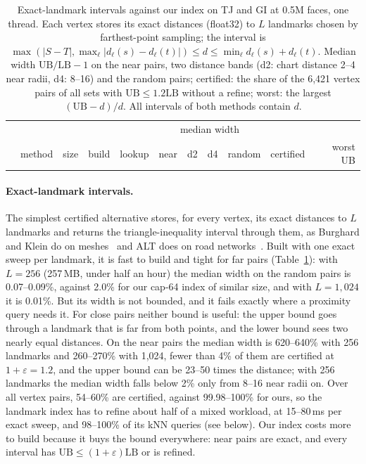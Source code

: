 \documentclass[sigconf,nonacm,screen]{acmart}
\newcommand{\LB}{\mathrm{LB}}
\newcommand{\UB}{\mathrm{UB}}
\newcommand{\eps}{\varepsilon}
\begin{document}
\begin{table}[t]
\caption{Exact-landmark intervals against our index on TJ and GI at 0.5M faces, one thread. Each vertex stores its
exact distances (float32) to $L$ landmarks chosen by farthest-point sampling; the interval is
$\max(|S-T|,\max_\ell|d_\ell(s)-d_\ell(t)|)\le d\le\min_\ell d_\ell(s)+d_\ell(t)$. Median width $\UB/\LB-1$ on the near
pairs, two distance bands (d2: chart distance 2--4 near radii, d4: 8--16) and the random pairs; certified: the share
of the 6,421 vertex pairs of all sets with $\UB\le1.2\LB$ without a refine; worst: the largest $(\UB-d)/d$. All
intervals of both methods contain $d$.}
\label{tab:landmarks}
\small
\begin{tabular}{@{}llrrr|rrrr|rr@{}}
\toprule
 & & & & & \multicolumn{4}{c|}{median width} & & \\
 & method & size & build & lookup & near & d2 & d4 & random & certified & worst UB\\
\midrule

\end{tabular}
\end{table}

\paragraph{Exact-landmark intervals.}
The simplest certified alternative stores, for every vertex, its exact distances to $L$ landmarks and returns the
triangle-inequality interval through them, as Burghard and Klein do on meshes~\cite{burghard2015simple} and ALT
does on road networks~\cite{goldberg2005computing}. Built with one exact sweep per landmark, it is fast to build
and tight for far pairs (Table~\ref{tab:landmarks}): with $L=256$ (257\,MB, under half an hour) the median width on
the random pairs is 0.07--0.09\%, against 2.0\% for our cap-64 index of similar size, and with $L=1{,}024$ it is
0.01\%. But its width is not bounded, and it fails exactly where a proximity query needs it. For close pairs
neither bound is useful: the upper bound goes through a landmark that is far from both points, and the lower
bound sees two nearly equal distances. On the near pairs the median width is 620--640\% with 256 landmarks and
260--270\% with 1,024, fewer than 4\% of them are certified at $1+\eps=1.2$, and the upper bound can be 23--50 times
the distance; with 256 landmarks the median width falls below 2\% only from 8--16 near radii on. Over all vertex pairs, 54--60\% are certified, against
99.98--100\% for ours, so the landmark index has to refine about half of a mixed workload, at 15--80\,ms per exact
sweep, and 98--100\% of its kNN queries (see below). Our index costs more to build because it buys the bound
everywhere: near pairs are exact, and every interval has $\UB\le(1+\eps)\LB$ or is refined.
\end{document}

